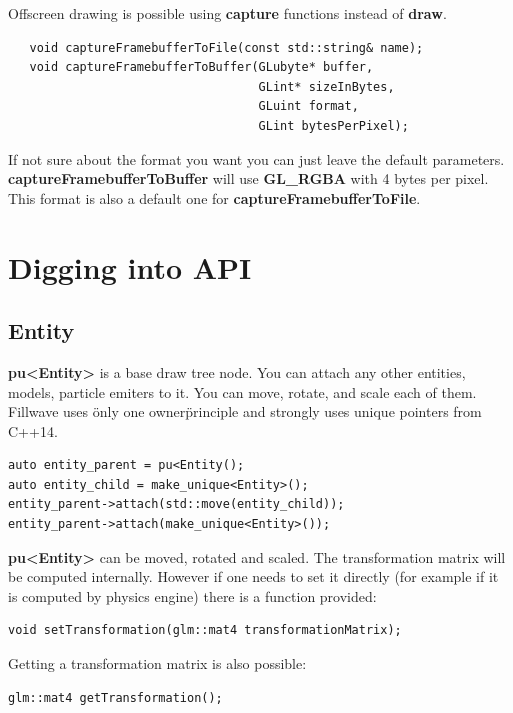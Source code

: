 \documentclass{article}
\begin{document}
\indent Offscreen drawing is possible using \textbf{capture} functions instead of \textbf{draw}.

\begin{lstlisting}
   void captureFramebufferToFile(const std::string& name);
   void captureFramebufferToBuffer(GLubyte* buffer,
                                   GLint* sizeInBytes,
                                   GLuint format,
                                   GLint bytesPerPixel);
\end{lstlisting}
\indent \indent If not sure about the format you want you can just leave the default parameters. \textbf{captureFramebufferToBuffer} will use \textbf{GL\_RGBA} with 4 bytes per pixel. This format is also a default one for \textbf{captureFramebufferToFile}.

\section{Digging into API}

\subsection{Entity}\label{sec:Entity}
\indent \indent \textbf{pu<Entity>} is a base draw tree node. You can attach any other entities, models, particle emiters to it. You can move, rotate, and scale each of them. Fillwave uses \"only one owner\" principle and strongly uses unique pointers from C++14.

\begin{lstlisting}
auto entity_parent = pu<Entity();
auto entity_child = make_unique<Entity>();
entity_parent->attach(std::move(entity_child));
entity_parent->attach(make_unique<Entity>());
\end{lstlisting}

\indent \indent \textbf{pu<Entity>} can be moved, rotated and scaled. The transformation matrix will be computed internally. However if one needs to set it directly (for example if it is computed by physics engine) there is a function provided:

\begin{lstlisting}
void setTransformation(glm::mat4 transformationMatrix);
\end{lstlisting}

\indent \indent Getting a transformation matrix is also possible:

\begin{lstlisting}
glm::mat4 getTransformation();
\end{lstlisting}
\end{document}
